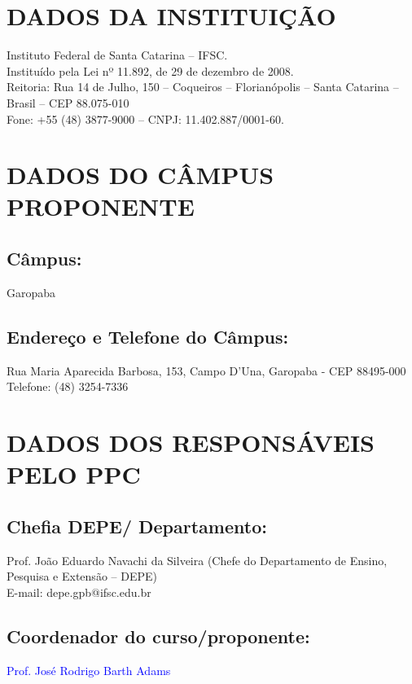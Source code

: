 \documentclass{../../modelos/latex-shared/ifsc-ppc}
\newcommand{\revisao}[1]{\textcolor{blue}{#1}}
\newcommand{\revisao}[1]{#1}
\begin{document}

\tableofcontents
\newpage

\section{DADOS DA INSTITUIÇÃO}
Instituto Federal de Santa Catarina -- IFSC. \\
Instituído pela Lei nº 11.892, de 29 de dezembro de 2008. \\
Reitoria: Rua 14 de Julho, 150 -- Coqueiros -- Florianópolis -- Santa Catarina -- Brasil -- CEP 88.075-010 \\
Fone: +55 (48) 3877-9000 -- CNPJ: 11.402.887/0001-60.

\section{DADOS DO CÂMPUS PROPONENTE}
\subsection{Câmpus:}
Garopaba

\subsection{Endereço e Telefone do Câmpus:}
Rua Maria Aparecida Barbosa, 153, Campo D'Una, Garopaba - CEP 88495-000 \\
Telefone: (48) 3254-7336

\section{DADOS DOS RESPONSÁVEIS PELO PPC}
\subsection{Chefia DEPE/ Departamento:}
Prof. João Eduardo Navachi da Silveira (Chefe do Departamento de Ensino, Pesquisa e Extensão -- DEPE) \\
E-mail: depe.gpb@ifsc.edu.br

\subsection{Coordenador do curso/proponente:}
\revisao{Prof. José Rodrigo Barth Adams}
\end{document}
